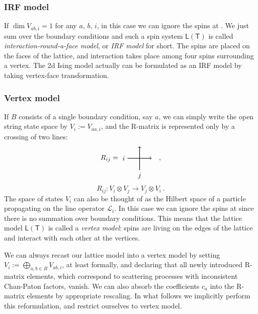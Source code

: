 \subsubsection*{IRF model}

If $\dim V_{ab,i}=1$ for any $a,\,b,\,i$, in this case we can ignore
the spins at . We just sum over the boundary conditions
and such a spin system $\mathsf{L}(\mathsf{T})$ is called
\emph{interaction-round-a-face model}, or \emph{IRF model} for short.
The spins are placed on the faces of the lattice, and interaction
takes place among four spins surrounding a vertex. The 2d Ising model
actually can be formulated as an IRF model by taking vertex-face transformation.


\subsubsection*{Vertex model}

If $B$ consists of a single boundary condition, say $a$, we can
simply write the open string state space by $V_{i}:=V_{aa,i}$, and
the R-matrix is represented only by a crossing of two lines:
\begin{equation}
  R_{ij}
  =
    \begin{tikzpicture}[scale=0.6, baseline=(x.base)]
        \node (x) at (0,0) {\vphantom{x}};

        \draw[thick, ->] (0,0) node[left] {$i$} -- (2,0);
        \draw[thick, ->] (1,-1) node[below] {$j$} -- (1,1);

    \end{tikzpicture}
  \quad ,
\end{equation}
\begin{equation}
  R_{ij}  :  V_{i}\otimes V_{j}  \longrightarrow  V_{j}\otimes V_{i}
  ~ .
\end{equation}
The space of states $V_{i}$ can also be thought of as the Hilbert
space of a particle propagating on the line operator $\mathcal{L}_{i}$.
In this case we can ignore the spins at  since there
is no summation over boundary conditions. This means that the lattice
model $\mathsf{L}\left(\mathsf{T}\right)$ is called a \emph{vertex
model}: spins are living on the edges of the lattice and interact
with each other at the vertices.

We can always recast our lattice model into a vertex model by setting
$V_{i}:=\bigoplus_{a,b\in B}V_{ab,i}$, at least formally, and declaring
that all newly introduced R-matrix elements, which correspond to scattering
processes with inconsistent Chan-Paton factors, vanish. We can also
absorb the coefficients $c_{a}$ into the R-matrix elements by appropriate
rescaling. In what follows we implicitly perform this reformulation,
and restrict ourselves to vertex model.

